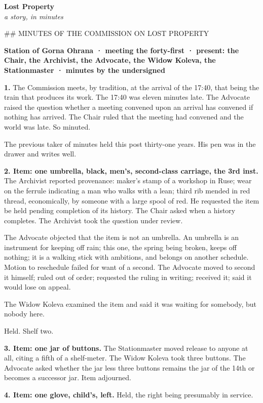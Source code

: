 \documentclass[11pt]{article}
\begin{document}
\begin{center}
{\LARGE\bfseries Lost Property}\\[6pt]
{\itshape a story, in minutes}
\end{center}
\bigskip
\#\# MINUTES OF THE COMMISSION ON LOST PROPERTY

\textbf{Station of Gorna Ohrana · meeting the forty-first · present: the Chair, the Archivist, the Advocate, the Widow Koleva, the Stationmaster · minutes by the undersigned}

\textbf{1.} The Commission meets, by tradition, at the arrival of the 17:40, that being the train that produces its work. The 17:40 was eleven minutes late. The Advocate raised the question whether a meeting convened upon an arrival has convened if nothing has arrived. The Chair ruled that the meeting had convened and the world was late. So minuted.

The previous taker of minutes held this post thirty-one years. His pen was in the drawer and writes well.

\textbf{2. Item: one umbrella, black, men's, second-class carriage, the 3rd inst.} The Archivist reported provenance: maker's stamp of a workshop in Ruse; wear on the ferrule indicating a man who walks with a lean; third rib mended in red thread, economically, by someone with a large spool of red. He requested the item be held pending completion of its history. The Chair asked when a history completes. The Archivist took the question under review.

The Advocate objected that the item is not an umbrella. An umbrella is an instrument for keeping off rain; this one, the spring being broken, keeps off nothing; it is a walking stick with ambitions, and belongs on another schedule. Motion to reschedule failed for want of a second. The Advocate moved to second it himself; ruled out of order; requested the ruling in writing; received it; said it would lose on appeal.

The Widow Koleva examined the item and said it was waiting for somebody, but nobody here.

Held. Shelf two.

\textbf{3. Item: one jar of buttons.} The Stationmaster moved release to anyone at all, citing a fifth of a shelf-meter. The Widow Koleva took three buttons. The Advocate asked whether the jar less three buttons remains the jar of the 14th or becomes a successor jar. Item adjourned.

\textbf{4. Item: one glove, child's, left.} Held, the right being presumably in service.
\end{document}
